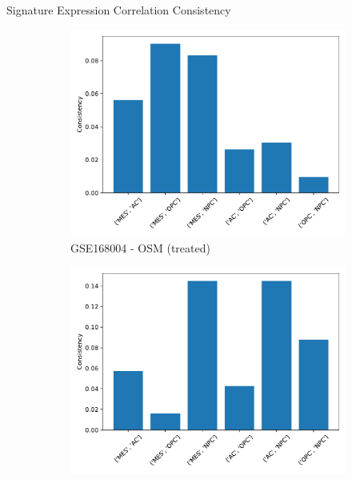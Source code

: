 \documentclass[aspectratio=169,9pt]{beamer}
\begin{document}
    \begin{frame}{Signature Expression Correlation Consistency}
        \begin{adjustwidth}{-5cm}{-5cm}
            \centering
            \begin{figure}\ContinuedFloat
                \centering
                \begin{subfigure}[b]{0.38\textwidth}
                    \centering
                    \includegraphics[width=\textwidth]{OSM_celllines_Consistency}
                    \caption{GSE168004 - OSM (treated)}
                \end{subfigure}
                \begin{subfigure}[b]{0.38\textwidth}
                    \centering
                    \includegraphics[width=\textwidth]{mgg23_Consistency}

\end{subfigure}
\end{figure}
\end{adjustwidth}
\end{frame}
\end{document}
